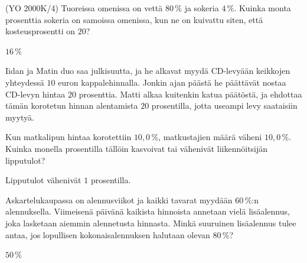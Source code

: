 \begin{tehtavasivu}
\begin{tehtava}
    (YO 2000K/4) Tuoreissa omenissa on vettä $80\,\%$ ja sokeria $4\,\%$. Kuinka monta prosenttia sokeria on samoissa omenissa, kun ne on kuivattu siten, että kosteusprosentti on $20$?
    \begin{vastaus}
        $16\,\%$
    \end{vastaus}
\end{tehtava}

\begin{tehtava}
    Iidan ja Matin duo saa julkisuutta, ja he alkavat myydä CD-levyään keikkojen yhteydessä $10$ euron kappalehinnalla. Jonkin ajan päästä he päättävät nostaa CD-levyn hintaa $20$ prosenttia. Matti alkaa kuitenkin katua päätöstä, ja ehdottaa tämän korotetun hinnan alentamista $20$ prosentilla, jotta useampi levy saataisiin myytyä.
    \begin{vastaus}
    \end{vastaus}
\end{tehtava}

\begin{tehtava}
    Kun matkalipun hintaa korotettiin $10,0\,\%$, matkustajien määrä väheni $10,0\,\%$. Kuinka monella prosentilla tällöin kasvoivat tai vähenivät liikennöitsijän lipputulot?
    \begin{vastaus}
        Lipputulot vähenivät $1$ prosentilla.
    \end{vastaus}
\end{tehtava}

\begin{tehtava}
    Askartelukaupassa on alennusviikot ja kaikki tavarat myydään $60\,\%$:n alennuksella. Viimeisenä päivänä kaikista hinnoista annetaan vielä lisäalennus, joka lasketaan aiemmin alennetusta hinnasta. Minkä suuruinen lisäalennus tulee antaa, jos lopullisen kokonaisalennuksen halutaan olevan $80\,\%$?
    \begin{vastaus}
        $50\,\%$
    \end{vastaus}
\end{tehtava}


\end{tehtavasivu}
